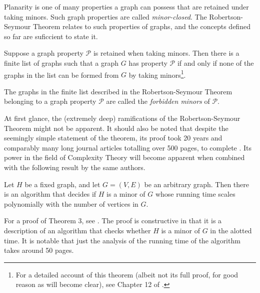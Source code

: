  Planarity is one of many properties a graph can possess that are retained under taking minors. Such graph properties are called \emph{minor-closed}. The Robertson-Seymour Theorem relates to such properties of graphs, and the concepts defined so far are suficcient to state it.

\begin{theorem}
Suppose a graph property $\mathcal{P}$ is retained when taking minors. Then there is a finite list of graphs such that a graph $G$ has property $\mathcal{P}$ if and only if none of the graphs in the list can be formed from $G$ by taking minors\footnote{For a detailed account of this theorem (albeit not its full proof, for good reason as will become clear), see Chapter 12 of \cite{diestelGraphTheory2017}.}.
\end{theorem}

\begin{remark}
  The graphs in the finite list described in the Robertson-Seymour Theorem belonging to a graph property $\mathcal{P}$ are called the \emph{forbidden minors} of $\mathcal{P}$.
\end{remark}

At first glance, the (extremely deep) ramifications of the Robertson-Seymour Theorem might not be apparent. It should also be noted that despite the seemingly simple statement of the theorem, its proof took 20 years and comparably many long journal articles totalling over 500 pages, to complete \cite{RobertsonSeymourTheorem2020}. Its power in the field of Complexity Theory will become apparent when combined with the following result by the same authors.
\begin{theorem}
Let $H$ be a fixed graph, and let $G= (V, E)$ be an arbitrary graph. Then there is an algorithm that decides if $H$ is a minor of $G$ whose running time scales polynomially with the number of vertices in $G$.
\end{theorem}
For a proof of Theorem 3, see \cite{seymourGraphMinorsXIII1995}. The proof is constructive in that it is a description of an algorithm that checks whether $H$ is a minor of $G$ in the alotted time. It is notable that just the analysis of the running time of the algorithm takes around 50 pages.


